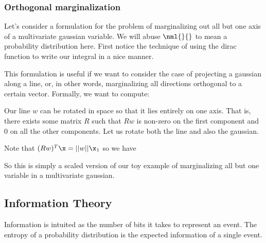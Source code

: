 \documentclass[12pt]{article}
\begin{document}
\subsubsection{Orthogonal marginalization}

Let's consider a formulation for the problem of marginalizing out all but one axis of a multivariate gaussian variable. We will abuse $\nml{}{}$ to mean a probability distribution here. First notice the technique of using the dirac function to write our integral in a nice manner.


This formulation is useful if we want to consider the case of projecting a gaussian along a line, or, in other words, marginalizing all directions orthogonal to a certain vector. Formally, we want to compute:


Our line $w$ can be rotated in space so that it lies entirely on one axis. That is, there exists some matrix $R$ such that $Rw$ is non-zero on the first component and 0 on all the other components. Let us rotate both the line and also the gaussian.


Note that $(Rw)^T \x = ||w|| \x_1$ so we have


So this is simply a scaled version of our toy example of marginalizing all but one variable in a multivariate gaussian.

\subsection{Information Theory}

Information is intuited as the number of bits it takes to represent an event. The entropy of a probability distribution is the expected information of a single event. 
\end{document}
